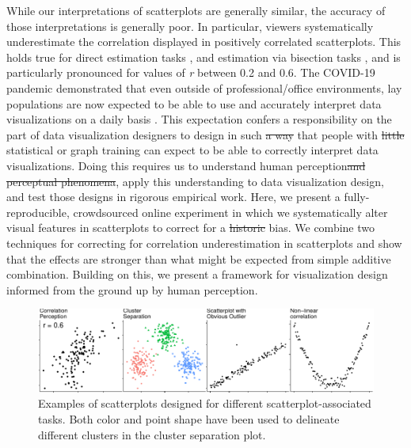 \documentclass[manuscript, review, anonymous, screen]{acmart}
\providecommand{\DIFaddtex}[1]{{\protect\color{blue}\uwave{#1}}} %
\providecommand{\DIFdeltex}[1]{{\protect\color{red}\sout{#1}}}                      %
\providecommand{\DIFaddbegin}{} %
\providecommand{\DIFaddend}{} %
\providecommand{\DIFdelbegin}{} %
\providecommand{\DIFdelend}{} %
\providecommand{\DIFadd}[1]{\texorpdfstring{\DIFaddtex{#1}}{#1}} %
\providecommand{\DIFdel}[1]{\texorpdfstring{\DIFdeltex{#1}}{}} %
\newcommand{\DIFscaledelfig}{0.5}
\newlength{\DIFdelgraphicswidth} %
\newlength{\DIFdelgraphicsheight} %
\newcommand{\DIFaddincludegraphics}[2][]{{\color{blue}\fbox{\DIFOincludegraphics[#1]{#2}}}} %
\newcommand{\DIFdelincludegraphics}[2][]{%
\sbox{\DIFdelgraphicsbox}{\DIFOincludegraphics[#1]{#2}}%
\settoboxwidth{\DIFdelgraphicswidth}{\DIFdelgraphicsbox} %
\settoboxtotalheight{\DIFdelgraphicsheight}{\DIFdelgraphicsbox} %
\scalebox{\DIFscaledelfig}{%
\parbox[b]{\DIFdelgraphicswidth}{\usebox{\DIFdelgraphicsbox}\\[-\baselineskip] \rule{\DIFdelgraphicswidth}{0em}}\llap{\resizebox{\DIFdelgraphicswidth}{\DIFdelgraphicsheight}{%
\setlength{\unitlength}{\DIFdelgraphicswidth}%
\begin{picture}(1,1)%
\thicklines\linethickness{2pt} %
{\color[rgb]{1,0,0}\put(0,0){\framebox(1,1){}}}%
{\color[rgb]{1,0,0}\put(0,0){\line( 1,1){1}}}%
{\color[rgb]{1,0,0}\put(0,1){\line(1,-1){1}}}%
\end{picture}%
}\hspace*{3pt}}} %
} %
\DeclareRobustCommand{\DIFaddbegin}{\DIFOaddbegin \let\includegraphics\DIFaddincludegraphics} %
\DeclareRobustCommand{\DIFaddend}{\DIFOaddend \let\includegraphics\DIFOincludegraphics} %
\DeclareRobustCommand{\DIFdelbegin}{\DIFOdelbegin \let\includegraphics\DIFdelincludegraphics} %
\DeclareRobustCommand{\DIFdelend}{\DIFOaddend \let\includegraphics\DIFOincludegraphics} %
\begin{document}
While our interpretations of scatterplots are generally similar, the
accuracy of those interpretations is generally poor. In particular,
viewers systematically underestimate the correlation displayed in
positively correlated scatterplots. This holds true for direct
estimation tasks
\citep{strahan_1978, bobko_1979, cleveland_1982, lane_1985, lauer_1989, collyer_1990, meyer_1992},
and estimation via bisection tasks \citep{rensink_2017}, and is
particularly pronounced for values of \emph{r} between 0.2 and 0.6. The
COVID-19 pandemic demonstrated that even outside of professional/office
environments, lay populations are now expected to be able to use and
accurately interpret data visualizations on a daily basis
\citep{bbc_2022}. This expectation confers a responsibility on the part
of data visualization designers to design in such \DIFdelbegin \DIFdel{a way }\DIFdelend \DIFaddbegin \DIFadd{ways }\DIFaddend that people with
\DIFdelbegin \DIFdel{little }\DIFdelend \DIFaddbegin \DIFadd{limited }\DIFaddend statistical or graph training can expect to be able to correctly
interpret data visualizations. Doing this requires us to understand
human perception\DIFdelbegin \DIFdel{and perceptual phenomena}\DIFdelend , apply this understanding to data visualization design,
and test those designs in rigorous empirical work. Here, we present a
fully-reproducible, crowdsourced online experiment in which we
systematically alter visual features in scatterplots to correct for a
\DIFdelbegin \DIFdel{historic }\DIFdelend \DIFaddbegin \DIFadd{well-known }\DIFaddend bias. We combine two techniques for correcting for
correlation underestimation in scatterplots and show that the effects
are stronger than what might be expected from simple additive
combination. Building on this, we present a framework for visualization
design informed from the ground up by human perception.

\begin{figure}

{\centering \includegraphics[width=1\textwidth,height=\textheight]{size_and_opacity_files/figure-pdf/fig-tasks-1.pdf}

}

\caption{\label{fig-tasks}Examples of scatterplots designed for
different scatterplot-associated tasks. Both color and point shape have
been used to delineate different clusters in the cluster separation
plot.}

\end{figure}
\end{document}
